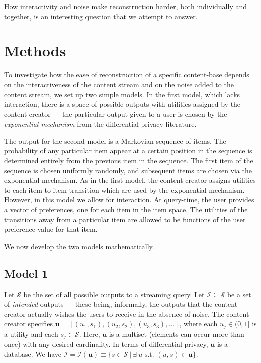 \documentclass[preprint2]{aastex}
\begin{document}
How interactivity and noise make reconstruction harder, both individually and together, is an interesting question that we attempt to answer.

\section{Methods}

To investigate how the ease of reconstruction of a specific content-base depends on the interactiveness of the content stream and on the noise added to the content stream, we set up two simple models. In the first model, which lacks interaction, there is a space of possible outputs with utilities assigned by the content-creator --- the particular output given to a user is chosen by the \emph{exponential mechanism} from the differential privacy literature.

The output for the second model is a Markovian sequence of items. The probability of any particular item appear at a certain position in the sequence is determined entirely from the previous item in the sequence. The first item of the sequence is chosen uniformly randomly, and subsequent items are chosen via the exponential mechanism. As in the first model, the content-creator assigns utilities to each item-to-item transition which are used by the exponential mechanism. However, in this model we allow for interaction. At query-time, the user provides a vector of preferences, one for each item in the item space. The utilities of the transitions away from a particular item are allowed to be functions of the user preference value for that item.

We now develop the two models mathematically.

\subsection{Model 1}

Let \(\mathcal{S}\) be the set of all possible outputs to a streaming query. Let \(\mathcal{I} \subseteq \mathcal{S}\) be a set of \emph{intended} outputs --- these being, informally, the outputs that the content-creator actually wishes the users to receive in the absence of noise. The content creator specifies \(\mathbf{u} = [(u_1, s_1), (u_2, s_2), (u_3, s_3), \dots]\), where each \(u_j \in (0, 1]\) is a utility and each \(s_j \in \mathcal{S}\). Here, \(\mathbf{u}\) is a multiset (elements can occur more than once) with any desired cardinality. In terms of differential privacy, \(\mathbf{u}\) is a database. We have \(\mathcal{I} = \mathcal{I}(\mathbf{u}) \equiv \{s \in \mathcal{S} \ | \ \exists \ u \text{ s.t. } (u, s) \in \mathbf{u}\}\).
\end{document}
